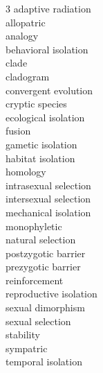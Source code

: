 
\begin{multicols}{3}
adaptive radiation \\
allopatric \\
analogy \\
behavioral isolation \\
clade \\
cladogram \\
convergent evolution \\
cryptic species \\
ecological isolation \\
fusion \\
gametic isolation \\
habitat isolation \\
homology \\
intrasexual selection \\
intersexual selection \\
mechanical isolation \\
monophyletic \\
natural selection \\
postzygotic barrier \\
prezygotic barrier \\
reinforcement \\
reproductive isolation \\
sexual dimorphism \\
sexual selection \\
stability \\
sympatric \\
temporal isolation
\end{multicols}
